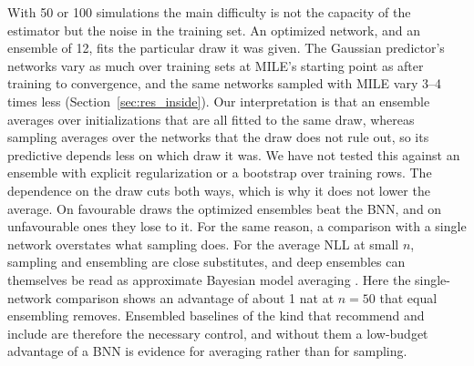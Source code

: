 \documentclass[11pt]{article}
\begin{document}
 With 50 or 100 simulations the main difficulty is not
the capacity of the estimator but the noise in the training set. An optimized network, and an ensemble of 12, fits the
particular draw it was given. The Gaussian predictor's networks vary as much over training sets at MILE's starting point
as after training to convergence, and the same networks sampled with MILE vary 3--4 times less
(Section~\ref{sec:res_inside}). Our interpretation is that an ensemble averages over initializations that are all fitted
to the same draw, whereas sampling averages over the networks that the draw does not rule out, so its predictive
depends less on which draw it was. We have not tested this against an ensemble with explicit regularization or a
bootstrap over training rows. The dependence on the draw cuts both ways, which is why it does not lower the average. On
favourable draws the optimized ensembles beat the BNN, and on unfavourable ones they lose to it. For the same reason, a
comparison with a single network overstates what sampling does. For the average NLL at small $n$, sampling and
ensembling are close substitutes, and deep ensembles can themselves be read as approximate Bayesian model averaging
\citep{wilson2020bayesian}. Here the single-network comparison shows an advantage of about 1 nat at $n=50$ that equal
ensembling removes. Ensembled baselines of the kind that \citet{hermans2022trust} recommend and
\citet{delaunoy2024lowbudget} include are therefore the necessary control, and without them a low-budget advantage of a
BNN is evidence for averaging rather than for sampling.
\end{document}
